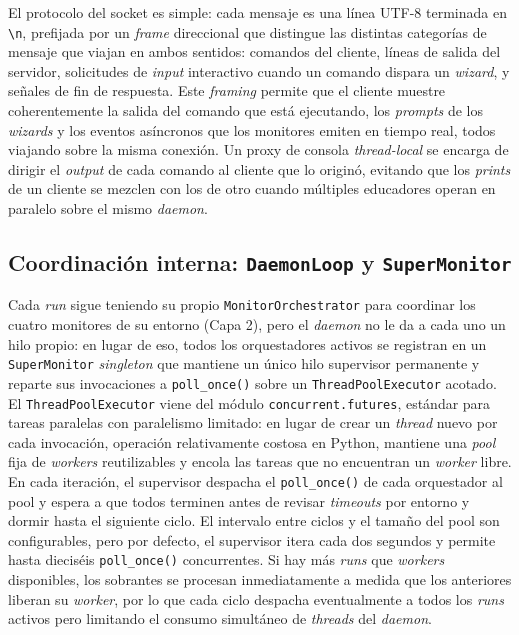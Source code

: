 El protocolo del socket es simple: cada mensaje es una línea UTF-8 terminada en
\texttt{\textbackslash{}n}, prefijada por un \textit{frame} direccional que
distingue las distintas categorías de mensaje que viajan en ambos sentidos:
comandos del cliente, líneas de salida del servidor, solicitudes de
\textit{input} interactivo cuando un comando dispara un \textit{wizard}, y
señales de fin de respuesta. Este \textit{framing} permite que el cliente
muestre coherentemente la salida del comando que está ejecutando, los
\textit{prompts} de los \textit{wizards} y los eventos asíncronos que los
monitores emiten en tiempo real, todos viajando sobre la misma conexión. Un
proxy de consola \textit{thread-local} se encarga de dirigir el \textit{output}
de cada comando al cliente que lo originó, evitando que los \textit{prints} de
un cliente se mezclen con los de otro cuando múltiples educadores operan en
paralelo sobre el mismo \textit{daemon}.

\subsection{Coordinación interna: \texttt{DaemonLoop} y \texttt{SuperMonitor}}
\begin{sloppypar}
Cada \textit{run} sigue teniendo su propio \texttt{MonitorOrchestrator} para
coordinar los cuatro monitores de su entorno (Capa 2), pero el \textit{daemon}
no le da a cada uno un hilo propio: en lugar de eso, todos los orquestadores
activos se registran en un \texttt{SuperMonitor} \textit{singleton} que mantiene
un único hilo supervisor permanente y reparte sus invocaciones a
\texttt{poll\_once()} sobre un \texttt{ThreadPoolExecutor} acotado. El
\texttt{ThreadPoolExecutor} viene del módulo \texttt{concurrent.futures},
estándar para tareas paralelas con paralelismo limitado: en lugar de crear un
\textit{thread} nuevo por cada invocación, operación relativamente costosa en
Python, mantiene una \textit{pool} fija de \textit{workers} reutilizables y
encola las tareas que no encuentran un \textit{worker} libre. En cada iteración,
el supervisor despacha el \texttt{poll\_once()} de cada orquestador al pool y
espera a que todos terminen antes de revisar \textit{timeouts} por entorno y
dormir hasta el siguiente ciclo. El intervalo entre ciclos y el tamaño del pool
son configurables, pero por defecto, el supervisor itera cada dos segundos y
permite hasta dieciséis \texttt{poll\_once()} concurrentes. Si hay más
\textit{runs} que \textit{workers} disponibles, los sobrantes se procesan
inmediatamente a medida que los anteriores liberan su \textit{worker}, por lo
que cada ciclo despacha eventualmente a todos los \textit{runs} activos pero
limitando el consumo simultáneo de \textit{threads} del \textit{daemon}.
\end{sloppypar}

